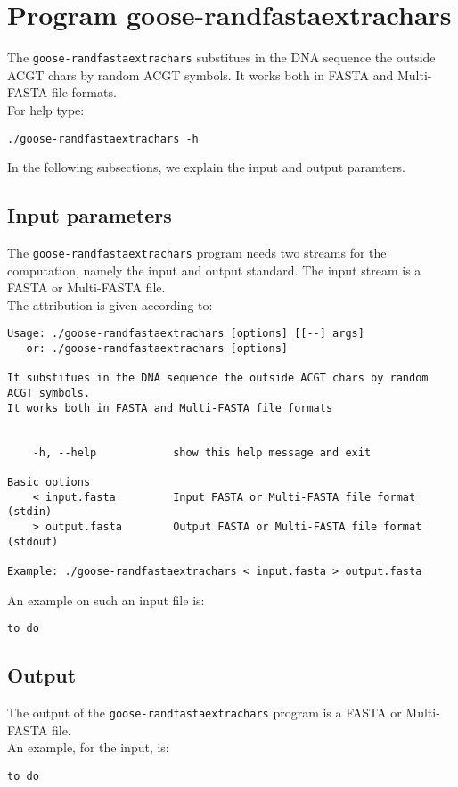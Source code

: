 \section{Program goose-randfastaextrachars}
The \texttt{goose-randfastaextrachars} substitues in the DNA sequence the outside ACGT chars by random ACGT symbols. It works both in FASTA and Multi-FASTA file formats.\\
For help type:
\begin{lstlisting}
./goose-randfastaextrachars -h
\end{lstlisting}
In the following subsections, we explain the input and output paramters.

\subsection{Input parameters}

The \texttt{goose-randfastaextrachars} program needs two streams for the computation,
namely the input and output standard. The input stream is a FASTA or Multi-FASTA file.\\
The attribution is given according to:
\begin{lstlisting}
Usage: ./goose-randfastaextrachars [options] [[--] args]
   or: ./goose-randfastaextrachars [options]

It substitues in the DNA sequence the outside ACGT chars by random ACGT symbols.
It works both in FASTA and Multi-FASTA file formats


    -h, --help            show this help message and exit

Basic options
    < input.fasta         Input FASTA or Multi-FASTA file format (stdin)
    > output.fasta        Output FASTA or Multi-FASTA file format (stdout)

Example: ./goose-randfastaextrachars < input.fasta > output.fasta
\end{lstlisting}

An example on such an input file is:
\begin{lstlisting}
to do
\end{lstlisting}

\subsection{Output}
The output of the \texttt{goose-randfastaextrachars} program is a FASTA or Multi-FASTA file.\\
An example, for the input, is:
\begin{lstlisting}
to do
\end{lstlisting}